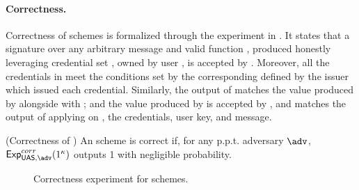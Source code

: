 \paragraph{Correctness.} %
Correctness of \UAS schemes is formalized through the experiment in
. It states that a signature over any arbitrary message
and valid function \feval, produced honestly leveraging credential set \scid,
owned by user \uid, is accepted by \Verify. Moreover, all the credentials in
\scid meet the conditions set by the corresponding \fissue defined by the issuer
which issued each credential. Similarly, the output of \feval matches the
value produced by \Sign alongside with \sig; and the value produced by \Open
is accepted by \Judge, and matches the output of applying \finsp on \Yeval, the
credentials, user key, and message.

\begin{definition}{(Correctness of \UAS)}
  \label{def:correctness-uas}
  An \UAS scheme is correct if, for any p.p.t. adversary $\adv$,
  $\ExpCorrect(1^\secpar)$ outputs 1 with negligible probability.
\end{definition}

\begin{figure}[htp!]
  \caption{Correctness experiment for \UAS schemes.}
  \label{fig:exp-uas-corr}
\end{figure}

